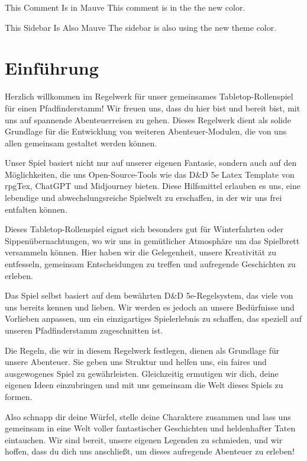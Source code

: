\documentclass[letterpaper,twocolumn,openany,nodeprecatedcode]{dndbook}
\begin{document}
\begingroup
\DndSetThemeColor[PhbMauve]

\begin{DndComment}{This Comment Is in Mauve}
  This comment is in the the new color.
\end{DndComment}

\begin{DndSidebar}{This Sidebar Is Also Mauve}
  The sidebar is also using the new theme color.
\end{DndSidebar}
\endgroup

\chapter{Einführung}
Herzlich willkommen im Regelwerk für unser gemeinsames Tabletop-Rollenspiel für einen Pfadfinderstamm! Wir freuen uns, dass du hier bist und bereit bist, mit uns auf spannende Abenteuerreisen zu gehen. Dieses Regelwerk dient als solide Grundlage für die Entwicklung von weiteren Abenteuer-Modulen, die von uns allen gemeinsam gestaltet werden können.

Unser Spiel basiert nicht nur auf unserer eigenen Fantasie, sondern auch auf den Möglichkeiten, die uns Open-Source-Tools wie das D\&D 5e Latex Template von rpgTex, ChatGPT und Midjourney bieten. Diese Hilfsmittel erlauben es uns, eine lebendige und abwechslungsreiche Spielwelt zu erschaffen, in der wir uns frei entfalten können.

Dieses Tabletop-Rollenspiel eignet sich besonders gut für Winterfahrten oder Sippenübernachtungen, wo wir uns in gemütlicher Atmosphäre um das Spielbrett versammeln können. Hier haben wir die Gelegenheit, unsere Kreativität zu entfesseln, gemeinsam Entscheidungen zu treffen und aufregende Geschichten zu erleben.

Das Spiel selbst basiert auf dem bewährten D\&D 5e-Regelsystem, das viele von uns bereits kennen und lieben. Wir werden es jedoch an unsere Bedürfnisse und Vorlieben anpassen, um ein einzigartiges Spielerlebnis zu schaffen, das speziell auf unseren Pfadfinderstamm zugeschnitten ist.

Die Regeln, die wir in diesem Regelwerk festlegen, dienen als Grundlage für unsere Abenteuer. Sie geben uns Struktur und helfen uns, ein faires und ausgewogenes Spiel zu gewährleisten. Gleichzeitig ermutigen wir dich, deine eigenen Ideen einzubringen und mit uns gemeinsam die Welt dieses Spiels zu formen.

Also schnapp dir deine Würfel, stelle deine Charaktere zusammen und lass uns gemeinsam in eine Welt voller fantastischer Geschichten und heldenhafter Taten eintauchen. Wir sind bereit, unsere eigenen Legenden zu schmieden, und wir hoffen, dass du dich uns anschließt, um dieses aufregende Abenteuer zu erleben!
\end{document}
